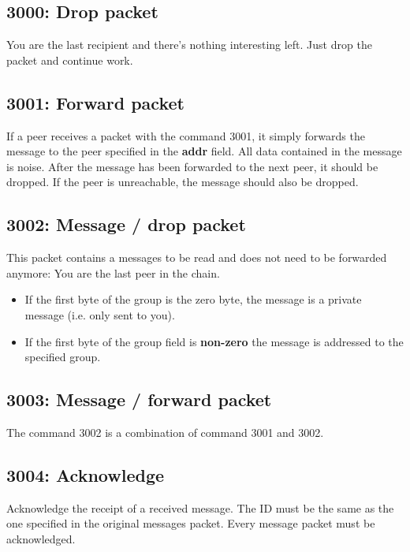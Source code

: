 \documentclass[12pt,a4paper]{book}
\begin{document}
\subsection{3000: Drop packet}
You are the last recipient and there's nothing interesting left.
Just drop the packet and continue work.
\subsection{3001: Forward packet}
If a peer receives a packet with the command 3001, it simply forwards
the message to the peer specified in the \textbf{addr} field.
All data contained in the message
is noise. After the message has been forwarded to the next peer, it
should be dropped. If the peer is unreachable, the message should also
be dropped.
\subsection{3002: Message / drop packet}
This packet contains a messages to be read and does not need to be forwarded
anymore: You are the last peer in the chain.
\begin{itemize}
\item If the first byte of the group is the zero byte, the message
is a private message (i.e. only sent to you).
\item If the first byte of the group field is \textbf{non-zero} the message
is addressed to the specified group.
\end{itemize}
\subsection{3003: Message / forward packet}
The command 3002 is a combination of command 3001 and 3002.
\subsection{3004: Acknowledge}
Acknowledge the receipt of a received message. The ID must be the same as
the one specified in the original messages packet.
Every message packet must be acknowledged.
\end{document}
